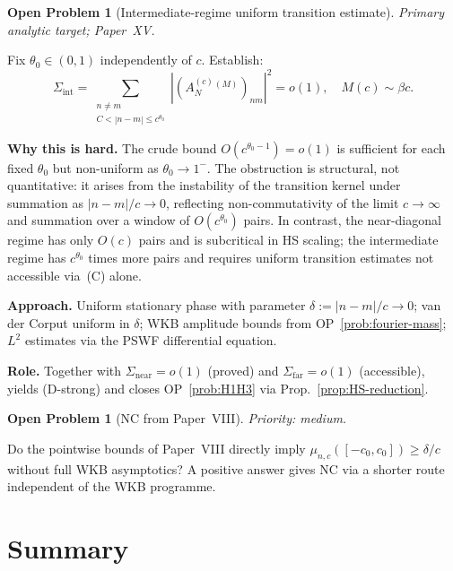 \documentclass[12pt,a4paper]{amsart}
\theoremstyle{definition}
\newtheorem{problem}[theorem]{Open Problem}
\theoremstyle{remark}
\newcommand{\Ac}{A_N^{(c)}}
\begin{document}
\begin{problem}[Intermediate-regime
  uniform transition estimate]
\label{prob:intermediate}
\emph{Primary analytic target;
  Paper~XV.}

Fix $\theta_0\in(0,1)$ independently
of $c$. Establish:
\begin{equation}\label{eq:intermediate}
  \Sigma_{\mathrm{int}}
  = \sum_{\substack{n\ne m \\
    C<|n-m|\le c^{\theta_0}}}
  \left|(\Ac^{(M)})_{nm}\right|^2
  = o(1),
  \quad M(c)\sim\beta c.
\end{equation}

\medskip\noindent
\textbf{Why this is hard.}
The crude bound
$O(c^{\theta_0-1})=o(1)$
is sufficient for each fixed $\theta_0$
but non-uniform as $\theta_0\to 1^-$.
The obstruction is structural, not
quantitative: it arises from the
instability of the transition kernel
under summation as $|n-m|/c\to 0$,
reflecting non-commutativity of
the limit $c\to\infty$ and summation
over a window of $O(c^{\theta_0})$
pairs.
In contrast, the near-diagonal regime
has only $O(c)$ pairs and is
subcritical in HS scaling;
the intermediate regime has
$c^{\theta_0}$ times more pairs and
requires uniform transition estimates
not accessible via~(C) alone.

\medskip\noindent
\textbf{Approach.}
Uniform stationary phase with
parameter $\delta:=|n-m|/c\to 0$;
van der Corput uniform in $\delta$;
WKB amplitude bounds from
OP~\ref{prob:fourier-mass};
$L^2$ estimates via the PSWF
differential equation.

\medskip\noindent
\textbf{Role.}
Together with
$\Sigma_{\mathrm{near}}=o(1)$
(proved) and
$\Sigma_{\mathrm{far}}=o(1)$
(accessible),
yields (D-strong) and closes
OP~\ref{prob:H1H3} via
Prop.~\ref{prop:HS-reduction}.
\end{problem}

\begin{problem}[NC from Paper~VIII]
\label{prob:NC-direct}
\emph{Priority: medium.}

Do the pointwise bounds of Paper~VIII
directly imply
$\mu_{n,c}([-c_0,c_0])\ge\delta/c$
without full WKB asymptotics?
A positive answer gives NC via a
shorter route independent of the
WKB programme.
\end{problem}

\section{Summary}
\label{sec:summary}
\end{document}
